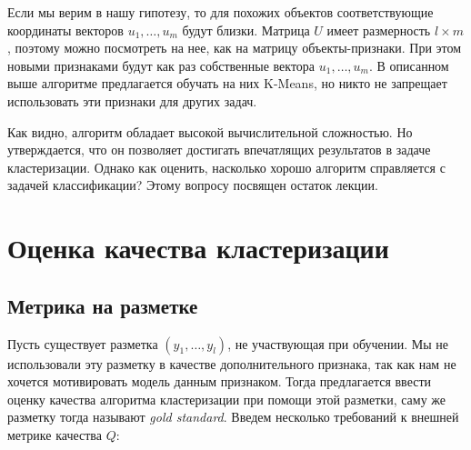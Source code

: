 \documentclass[12pt,fleqn]{article}
\begin{document}
Если мы верим в нашу гипотезу, то для похожих объектов соответствующие координаты векторов $u_1, \dots, u_m$ будут близки. Матрица $U$ имеет размерность $l\times m$, поэтому можно посмотреть на нее, как на матрицу объекты-признаки. При этом новыми признаками будут как раз собственные вектора $u_1, \dots, u_m$. В описанном выше алгоритме предлагается обучать на них K-Means, но никто не запрещает использовать эти признаки для других задач.

Как видно, алгоритм обладает высокой вычислительной сложностью. Но утверждается, что он позволяет достигать впечатлящих результатов в задаче кластеризации. Однако как оценить, насколько хорошо алгоритм справляется с задачей классификации? Этому вопросу посвящен остаток лекции.

\section{Оценка качества кластеризации}

\subsection{Метрика на разметке}

Пусть существует разметка $(y_1, \dots, y_l)$, не участвующая при обучении. Мы не использовали эту разметку в качестве дополнительного признака, так как нам не хочется мотивировать модель данным признаком. Тогда предлагается ввести оценку качества алгоритма кластеризации при помощи этой разметки, саму же разметку тогда называют {\it gold standard}. Введем несколько требований к внешней метрике качества $Q$:
\end{document}
